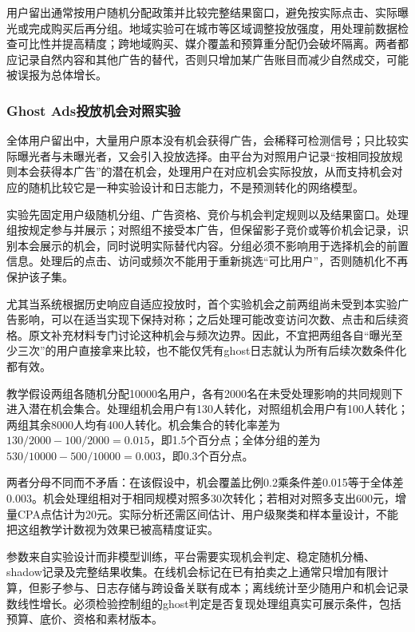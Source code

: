 用户留出通常按用户随机分配政策并比较完整结果窗口，避免按实际点击、实际曝光或完成购买后再分组。地域实验可在城市等区域调整投放强度，用处理前数据检查可比性并提高精度；跨地域购买、媒介覆盖和预算重分配仍会破坏隔离。两者都应记录自然内容和其他广告的替代，否则只增加某广告账目而减少自然成交，可能被误报为总体增长。

\subsubsection{Ghost Ads投放机会对照实验}
\label{sec:rs-advertising-ghost}

全体用户留出中，大量用户原本没有机会获得广告，会稀释可检测信号；只比较实际曝光者与未曝光者，又会引入投放选择。由平台为对照用户记录“按相同投放规则本会获得本广告”的潜在机会，处理用户在对应机会实际投放，从而支持机会对应的随机比较它是一种实验设计和日志能力，不是预测转化的网络模型。

实验先固定用户级随机分组、广告资格、竞价与机会判定规则以及结果窗口。处理组按规定参与并展示；对照组不接受本广告，但保留影子竞价或等价机会记录，识别本会展示的机会，同时说明实际替代内容。分组必须不影响用于选择机会的前置信息。处理后的点击、访问或频次不能用于重新挑选“可比用户”，否则随机化不再保护该子集。

尤其当系统根据历史响应自适应投放时，首个实验机会之前两组尚未受到本实验广告影响，可以在适当实现下保持对称；之后处理可能改变访问次数、点击和后续资格。原文补充材料专门讨论这种机会与频次边界。因此，不宜把两组各自“曝光至少三次”的用户直接拿来比较，也不能仅凭有ghost日志就认为所有后续次数条件化都有效。

\begin{example}[全体留出与机会对应的分母]
教学假设两组各随机分配10000名用户，各有2000名在未受处理影响的共同规则下进入潜在机会集合。处理组机会用户有130人转化，对照组机会用户有100人转化；两组其余8000人均有400人转化。机会集合的转化率差为$130/2000-100/2000=0.015$，即1.5个百分点；全体分组的差为$530/10000-500/10000=0.003$，即0.3个百分点。

两者分母不同而不矛盾：在该假设中，机会覆盖比例0.2乘条件差0.015等于全体差0.003。机会处理组相对于相同规模对照多30次转化；若相对对照多支出600元，增量CPA点估计为20元。实际分析还需区间估计、用户级聚类和样本量设计，不能把这组教学计数视为效果已被高精度证实。
\end{example}

参数来自实验设计而非模型训练，平台需要实现机会判定、稳定随机分桶、shadow记录及完整结果收集。在线机会标记在已有拍卖之上通常只增加有限计算，但影子参与、日志存储与跨设备关联有成本；离线统计至少随用户和机会记录数线性增长。必须检验控制组的ghost判定是否复现处理组真实可展示条件，包括预算、底价、资格和素材版本。

